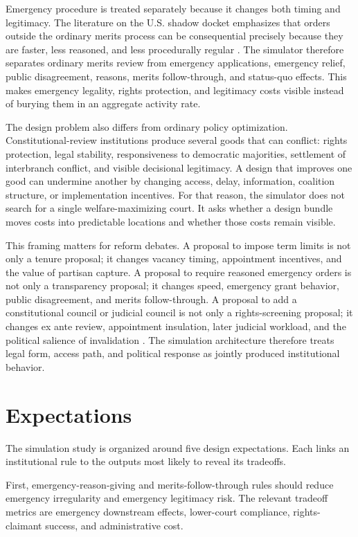 \documentclass[
    journal=jlc,
    manuscript=research-article,
    year=2026,
  ]{cup-journal}
\newcommand{\jlcite}[1]{\autocite{#1}}
\newcommand{\jlcite}[1]{\citep{#1}}
\begin{document}
Emergency procedure is treated separately because it changes both timing and legitimacy. The literature on the U.S. shadow docket emphasizes that orders outside the ordinary merits process can be consequential precisely because they are faster, less reasoned, and less procedurally regular \jlcite{Baude2015,Vladeck2023,ShadowDocketDatabase2025}. The simulator therefore separates ordinary merits review from emergency applications, emergency relief, public disagreement, reasons, merits follow-through, and status-quo effects. This makes emergency legality, rights protection, and legitimacy costs visible instead of burying them in an aggregate activity rate.

The design problem also differs from ordinary policy optimization. Constitutional-review institutions produce several goods that can conflict: rights protection, legal stability, responsiveness to democratic majorities, settlement of interbranch conflict, and visible decisional legitimacy. A design that improves one good can undermine another by changing access, delay, information, coalition structure, or implementation incentives. For that reason, the simulator does not search for a single welfare-maximizing court. It asks whether a design bundle moves costs into predictable locations and whether those costs remain visible.

This framing matters for reform debates. A proposal to impose term limits is not only a tenure proposal; it changes vacancy timing, appointment incentives, and the value of partisan capture. A proposal to require reasoned emergency orders is not only a transparency proposal; it changes speed, emergency grant behavior, public disagreement, and merits follow-through. A proposal to add a constitutional council or judicial council is not only a rights-screening proposal; it changes ex ante review, appointment insulation, later judicial workload, and the political salience of invalidation \jlcite{GaroupaGinsburg2009}. The simulation architecture therefore treats legal form, access path, and political response as jointly produced institutional behavior.

\section{Expectations}

The simulation study is organized around five design expectations. Each links an institutional rule to the outputs most likely to reveal its tradeoffs.

First, emergency-reason-giving and merits-follow-through rules should reduce emergency irregularity and emergency legitimacy risk. The relevant tradeoff metrics are emergency downstream effects, lower-court compliance, rights-claimant success, and administrative cost.
\end{document}
